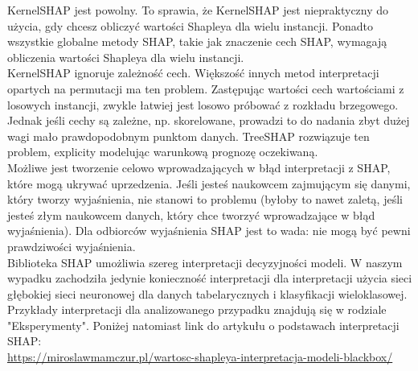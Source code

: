 KernelSHAP jest powolny. To sprawia, że KernelSHAP jest niepraktyczny do użycia, gdy chcesz obliczyć wartości Shapleya dla wielu instancji. Ponadto wszystkie globalne metody SHAP, takie jak znaczenie cech SHAP, wymagają obliczenia wartości Shapleya dla wielu instancji. \cite{shap}\\

KernelSHAP ignoruje zależność cech. Większość innych metod interpretacji opartych na permutacji ma ten problem. Zastępując wartości cech wartościami z losowych instancji, zwykle łatwiej jest losowo próbować z rozkładu brzegowego. Jednak jeśli cechy są zależne, np. skorelowane, prowadzi to do nadania zbyt dużej wagi mało prawdopodobnym punktom danych. TreeSHAP rozwiązuje ten problem, explicity modelując warunkową prognozę oczekiwaną. \cite{shap}\\

Możliwe jest tworzenie celowo wprowadzających w błąd interpretacji z SHAP, które mogą ukrywać uprzedzenia. Jeśli jesteś naukowcem zajmującym się danymi, który tworzy wyjaśnienia, nie stanowi to problemu (byłoby to nawet zaletą, jeśli jesteś złym naukowcem danych, który chce tworzyć wprowadzające w błąd wyjaśnienia). Dla odbiorców wyjaśnienia SHAP jest to wada: nie mogą być pewni prawdziwości wyjaśnienia. \cite{shap} \\

Biblioteka SHAP umożliwia szereg interpretacji decyzyjności modeli. W naszym wypadku zachodziła jedynie konieczność interpretacji dla interpretacji użycia sieci głębokiej sieci neuronowej dla danych tabelarycznych i klasyfikacji wieloklasowej. Przykłady interpretacji dla analizowanego przypadku znajdują się w rodziale "Eksperymenty". Poniżej natomiast link do artykułu o podstawach interpretacji SHAP:\\
\url{https://miroslawmamczur.pl/wartosc-shapleya-interpretacja-modeli-blackbox/}
